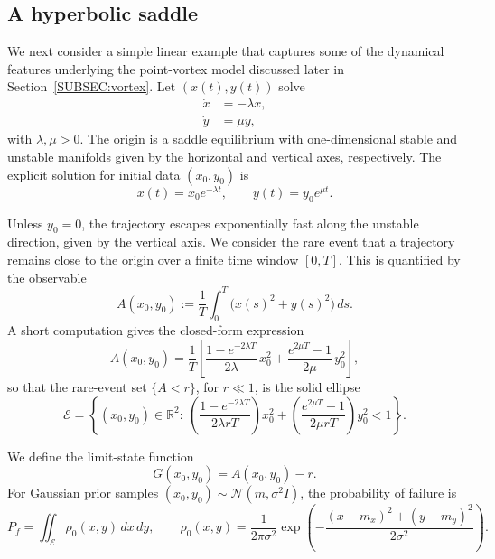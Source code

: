 \documentclass[a4paper]{article}
\numberwithin{equation}{section}
\begin{document}
\subsection{A hyperbolic saddle}
\label{SUBSEC:saddle}
We next consider a simple linear example that captures some of the dynamical
features underlying the point-vortex model discussed later in
Section~\ref{SUBSEC:vortex}.  Let $(x(t),y(t))$ solve
\begin{equation}
\label{eq:saddle_eq}
\begin{aligned}
    \dot{x} &= -\lambda x,\\
    \dot{y} &= \mu y,
\end{aligned}
\end{equation}
with $\lambda,\mu>0$.  The origin is a saddle equilibrium with one-dimensional
stable and unstable manifolds given by the horizontal and vertical axes,
respectively.  The explicit solution for initial data $(x_0,y_0)$ is
\begin{equation}
\label{eq:saddle_sols}
    x(t)=x_0 e^{-\lambda t}, 
    \qquad 
    y(t)=y_0 e^{\mu t}.
\end{equation}

Unless $y_0=0$, the trajectory escapes exponentially fast along the unstable
direction, given by the vertical axis.  We consider the rare event that a trajectory remains close to the
origin over a finite time window $[0,T]$.  This is quantified by the observable
\begin{equation}
    \label{eq:obs1_saddle}
    A(x_0,y_0)
    := \frac{1}{T} \int_0^T \bigl(x(s)^2 + y(s)^2 \bigr)\, ds.
\end{equation}
A short computation gives the closed-form expression
\[
A(x_0,y_0)
= \frac{1}{T}
\left[
  \frac{1-e^{-2\lambda T}}{2\lambda}\, x_0^2
  +
  \frac{e^{2\mu T}-1}{2\mu}\, y_0^2
\right],
\]
so that the rare-event set $\{A<r\}$, for $r\ll 1$, is the solid ellipse
\begin{equation}
\label{eq:failure_saddle_ellipse}
\mathcal{E}
=
\left\{
(x_0,y_0)\in\mathbb{R}^2:\ 
\left(\frac{1-e^{-2\lambda T}}{2\lambda r T}\right) x_0^2
+
\left(\frac{e^{2\mu T}-1}{2\mu r T}\right) y_0^2 
< 1
\right\}.
\end{equation}

We define the limit-state function
\begin{equation}
    \label{eq:LSF_saddle}
    G(x_0,y_0) = A(x_0,y_0) - r.
\end{equation}
For Gaussian prior samples $(x_0,y_0)\sim \mathcal{N}(m,\sigma^2 I)$, the
probability of failure is
\[
P_f
=
\iint_{\mathcal{E}} 
\rho_0(x,y)\,dx\,dy,
\qquad
\rho_0(x,y)
=
\frac{1}{2\pi\sigma^2}
\exp\!\left(
-\frac{(x-m_x)^2 + (y-m_y)^2}{2\sigma^2}
\right).
\]
\end{document}
